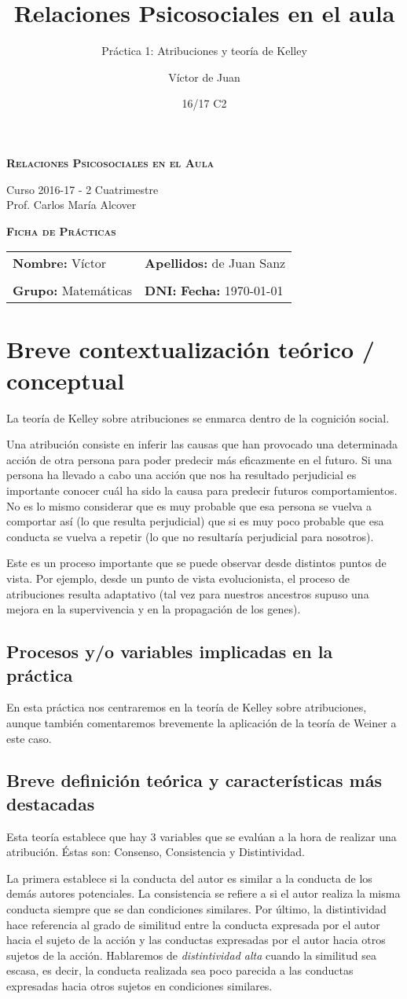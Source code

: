 \documentclass[palatino,nochap]{apuntesURJC}
\title{Relaciones Psicosociales en el aula}
\subtitle{Práctica 1: Atribuciones y teoría de Kelley}
\author{Víctor de Juan}
\date{16/17 C2}
\newcommand{\makeheader}[1]{
\begin{center}
\Large \textbf{\textsc{Relaciones Psicosociales en el Aula}}\\
\end{center}
\begin{center}
\large Curso 2016-17 - 2 Cuatrimestre\\
Prof. Carlos María Alcover
\end{center}

\begin{center}
\Large \textbf{\textsc{Ficha de Prácticas}}
\end{center}

\begin{center}
\begin{tabular}{ll}
\hspace{2cm}\textbf{Nombre:} Víctor &  \hspace{1.5cm} \textbf{Apellidos:} de Juan Sanz\\
\vspace{0.3cm}&\\
\textbf{Grupo:} Matemáticas 	& \textbf{DNI:} %
 \hspace{3cm} \textbf{Fecha:} #1
\end{tabular}
\end{center}
}
\begin{document}
\pagestyle{plain}
\maketitle

\makeheader{\today}

\section{Breve contextualización teórico / conceptual}

La teoría de Kelley sobre atribuciones se enmarca dentro de la cognición social.

Una atribución consiste en inferir las causas que han provocado una determinada acción de otra persona para poder predecir más eficazmente en el futuro.
%
Si una persona ha llevado a cabo una acción que nos ha resultado perjudicial es importante conocer cuál ha sido la causa para predecir futuros comportamientos.
%
No es lo mismo considerar que es muy probable que esa persona se vuelva a comportar así (lo que resulta perjudicial) que si es muy poco probable que esa conducta se vuelva a repetir (lo que no resultaría perjudicial para nosotros).

Este es un proceso importante que se puede observar desde distintos puntos de vista. %
Por ejemplo, desde un punto de vista evolucionista, el proceso de atribuciones resulta adaptativo (tal vez para nuestros ancestros supuso una mejora en la supervivencia y en la propagación de los genes). 

\subsection{Procesos y/o variables implicadas en la práctica}

En esta práctica nos centraremos en la teoría de Kelley sobre atribuciones, aunque también comentaremos brevemente la aplicación de la teoría de Weiner a este caso.

\subsection{Breve definición teórica y características más destacadas}

Esta teoría establece que hay 3 variables que se evalúan a la hora de realizar una atribución. 
%
Éstas son: Consenso, Consistencia y Distintividad.

La primera establece si la conducta del autor es similar a la conducta de los demás autores potenciales.
%
La consistencia se refiere a si el autor realiza la misma conducta siempre que se dan condiciones similares.
%
Por último, la distintividad hace referencia al grado de similitud entre la conducta expresada por el autor hacia el sujeto de la acción y las conductas expresadas por el autor hacia otros sujetos de la acción. 
%
Hablaremos de \textit{distintividad alta} cuando la similitud sea escasa, es decir, la conducta realizada sea poco parecida a las conductas expresadas hacia otros sujetos en condiciones similares.
\end{document}
